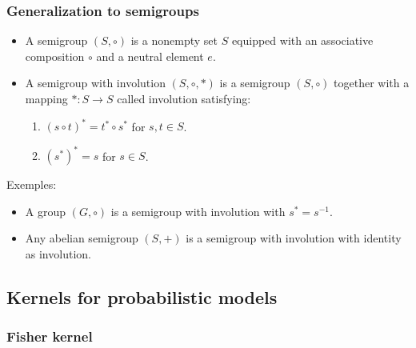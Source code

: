 \documentclass[10pt]{article}
\begin{document}
\subsubsection{Generalization to semigroups}
\begin{Definition}{}{}
  \begin{itemize}
    \item A semigroup $(S,\circ)$ is a nonempty set $S$ equipped with an 
    associative composition $\circ$ and a neutral element $e$.
    \item A semigroup with involution $(S,\circ, *)$ is a semigroup $(S,\circ)$
    together with a mapping $*:S\rightarrow S$ called involution satisfying:
    \begin{enumerate}
      \item $(s\circ t )^* = t^* \circ s^*$ for $s,t\in S$.
      \item $(s^*)^* = s$ for $s\in S$.
    \end{enumerate}
  \end{itemize}
  
  Exemples:
  \begin{itemize}
    \item A group $(G, \circ)$ is a semigroup with involution with $s^* = 
    s^{-1}$.
    \item Any abelian semigroup $(S, +)$ is a semigroup with involution with 
    identity as involution.
  \end{itemize}
\end{Definition}

\subsection{Kernels for probabilistic models}
\subsubsection{Fisher kernel}
\end{document}
